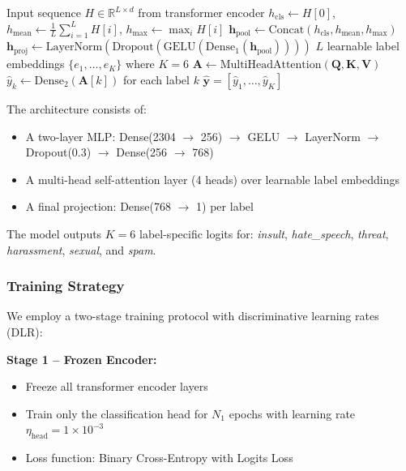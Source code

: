 \documentclass[12pt,a4paper]{article}
\begin{document}
\begin{algorithm}[htbp]
\caption{Label-Aware Attention Pooling}
\label{alg:head}
\begin{algorithmic}[1]
\Require Input sequence $H \in \mathbb{R}^{L \times d}$ from transformer encoder
\State $h_{\text{cls}} \gets H[0]$, $h_{\text{mean}} \gets \frac{1}{L}\sum_{i=1}^{L} H[i]$, $h_{\text{max}} \gets \max_{i} H[i]$
\State $\mathbf{h}_{\text{pool}} \gets \text{Concat}(h_{\text{cls}}, h_{\text{mean}}, h_{\text{max}})$ 
\State $\mathbf{h}_{\text{proj}} \gets \text{LayerNorm}(\text{Dropout}(\text{GELU}(\text{Dense}_1(\mathbf{h}_{\text{pool}}))))$
\State $L$ learnable label embeddings $\{e_1, \ldots, e_K\}$ where $K=6$
\State $\mathbf{A} \gets \text{MultiHeadAttention}(\mathbf{Q}, \mathbf{K}, \mathbf{V})$ 
\State $\hat{y}_k \gets \text{Dense}_2(\mathbf{A}[k])$ for each label $k$
\Return $\hat{\mathbf{y}} = [\hat{y}_1, \ldots, \hat{y}_K]$
\end{algorithmic}
\end{algorithm}

The architecture consists of:
\begin{itemize}[leftmargin=*]
    \item A two-layer MLP: Dense(2304 $\rightarrow$ 256) $\rightarrow$ GELU $\rightarrow$ LayerNorm $\rightarrow$ Dropout(0.3) $\rightarrow$ Dense(256 $\rightarrow$ 768)
    \item A multi-head self-attention layer (4 heads) over learnable label embeddings
    \item A final projection: Dense(768 $\rightarrow$ 1) per label
\end{itemize}

The model outputs $K=6$ label-specific logits for: \textit{insult}, \textit{hate\_speech}, \textit{threat}, \textit{harassment}, \textit{sexual}, and \textit{spam}.

\subsubsection{Training Strategy}

We employ a two-stage training protocol with discriminative learning rates (DLR):

\textbf{Stage 1 -- Frozen Encoder:}
\begin{itemize}[leftmargin=*]
    \item Freeze all transformer encoder layers
    \item Train only the classification head for $N_1$ epochs with learning rate $\eta_{\text{head}} = 1 \times 10^{-3}$
    \item Loss function: Binary Cross-Entropy with Logits Loss
\end{itemize}
\end{document}
